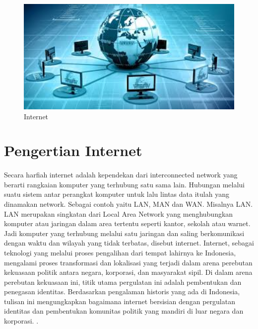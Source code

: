 
\begin{figure}[ht]
\centerline{\includegraphics[width=1\textwidth]{figures/1internet.JPG}}
\caption{Internet}
\end{figure}

\section{Pengertian Internet}
\paragraph{} Secara harfiah internet adalah kependekan dari interconnected network yang berarti rangkaian komputer yang terhubung satu sama lain. Hubungan melalui suatu sistem antar perangkat komputer untuk lalu lintas data itulah yang dinamakan network. Sebagai contoh yaitu LAN, MAN dan WAN. Misalnya LAN. LAN merupakan singkatan dari Local Area Network yang menghubungkan komputer atau jaringan dalam area tertentu seperti kantor, sekolah atau warnet. Jadi komputer yang terhubung melalui satu jaringan dan saling berkomunikasi dengan waktu dan wilayah yang tidak terbatas, disebut internet.
Internet, sebagai teknologi yang melalui proses pengalihan dari tempat lahirnya ke Indonesia, mengalami proses transformasi dan lokalisasi yang terjadi dalam arena perebutan kekuasaan politik antara negara, korporasi, dan masyarakat sipil. Di dalam arena perebutan kekuasaan ini, titik utama pergulatan ini adalah pembentukan dan penegasan identitas. Berdasarkan pengalaman historis yang ada di Indonesia, tulisan ini mengungkapkan bagaimana internet bersisian dengan pergulatan identitas dan pembentukan komunitas politik yang mandiri di luar negara dan korporasi.
\cite{darma2009buku}.

